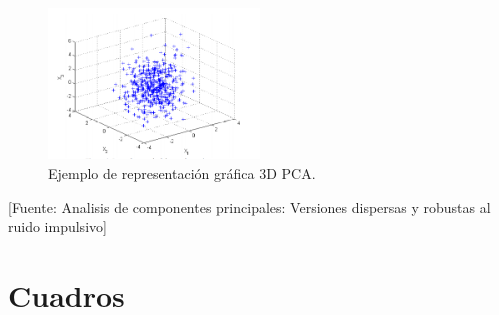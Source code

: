 \begin{figure}[H]
    \centering
    \caption{\label{fig:representacion3D} Ejemplo de  representación gráfica 3D PCA.}
    \includegraphics[width=0.5\textwidth]{figures/grafico3D.png}
\end{figure}
\begin{center}
    [Fuente: Analisis de componentes principales: Versiones dispersas y robustas al ruido impulsivo]\cite{andresSanchesMangas} 
\end{center}


\section{Cuadros}
\newpage


